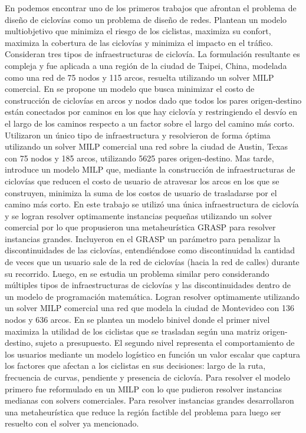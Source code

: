 \documentclass{article}
\begin{document}
  En \cite{Lin2013} podemos encontrar uno de los primeros trabajos que afrontan el problema de diseño de ciclovías como un problema de diseño de redes. Plantean un modelo multiobjetivo que minimiza el riesgo de los ciclistas, maximiza su confort, maximiza la cobertura de las ciclovías y minimiza el impacto en el tráfico. Consideran tres tipos de infraestructuras de ciclovía. La formulación resultante es compleja y fue aplicada a una región de la ciudad de Taipei, China, modelada como una red de 75 nodos y 115 arcos, resuelta utilizando un solver MILP comercial. En \cite{Duthie2014} se propone un modelo que busca minimizar el costo de construcción de ciclovías en arcos y nodos dado que todos los pares origen-destino están conectados por caminos en los que hay ciclovía y restringiendo el desvío en el largo de los caminos respecto a un factor sobre el largo del camino más corto. Utilizaron un único tipo de infraestructura y resolvieron de forma óptima utilizando un solver MILP comercial una red sobre la ciudad de Austin, Texas con 75 nodos y 185 arcos, utilizando 5625 pares origen-destino. Mas tarde, \cite{mauttone2017} introduce un modelo MILP que, mediante la construcción de infraestructuras de ciclovías que reducen el costo de usuario de atravesar los arcos en los que se construyen, minimiza la suma de los costos de usuario de trasladarse por el camino más corto. En este trabajo se utilizó una única infraestructura de ciclovía y se logran resolver optimamente instancias pequeñas utilizando un solver comercial por lo que propusieron una metaheurística GRASP para resolver instancias grandes. Incluyeron en el GRASP un parámetro para penalizar la discontinuidades de las ciclovías, entendiéndose como discontinuidad la cantidad de veces que un usuario sale de la red de ciclovías (hacia la red de calles) durante su recorrido. Luego, en \cite{baya2021} se estudia un problema similar pero considerando múltiples tipos de infraestructuras de ciclovías y las discontinuidades dentro de un modelo de programación matemática. Logran resolver optimamente utilizando un solver MILP comercial una red que modela la ciudad de Montevideo con 136 nodos y 636 arcos. En \cite{liu2019} se plantea un modelo binivel donde el primer nivel maximiza la utilidad de los ciclistas que se trasladan según una matriz origen-destino, sujeto a presupuesto. El segundo nivel representa el comportamiento de los usuarios mediante un modelo logístico en función un valor escalar que captura los factores que afectan a los ciclistas en sus decisiones: largo de la ruta, frecuencia de curvas, pendiente y presencia de ciclovía. Para resolver el modelo primero fue reformulado en un MILP con lo que pudieron resolver instancias medianas con solvers comerciales. Para resolver instancias grandes desarrollaron una metaheurística que reduce la región factible del problema para luego ser resuelto con el solver ya mencionado.
\end{document}
